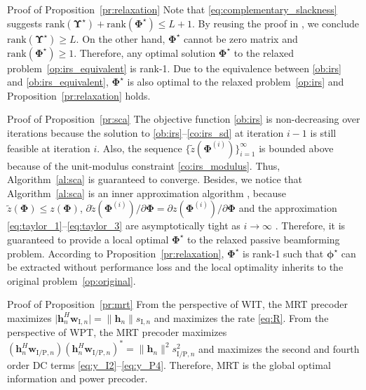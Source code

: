 \documentclass[journal,12pt,onecolumn,draftclsnofoot]{IEEEtran}
\begin{document}
\begin{appendix}
\begin{subsection}{Proof of Proposition~\ref{pr:relaxation}}
			Note that \eqref{eq:complementary_slackness} suggests $\mathrm{rank}(\boldsymbol{\Upsilon}^\star)+\mathrm{rank}(\boldsymbol{\Phi}^\star) \le L+1$. By reusing the proof in \cite[Appendix~A]{Xu2020}, we conclude $\mathrm{rank}(\boldsymbol{\Upsilon}^\star) \ge L$. On the other hand, $\boldsymbol{\Phi}^\star$ cannot be zero matrix and $\mathrm{rank}(\boldsymbol{\Phi}^\star) \ge 1$. Therefore, any optimal solution $\boldsymbol{\Phi}^\star$ to the relaxed problem~\eqref{op:irs_equivalent} is rank-\num{1}. Due to the equivalence between \eqref{ob:irs} and \eqref{ob:irs_equivalent}, $\boldsymbol{\Phi}^\star$ is also optimal to the relaxed problem~\eqref{op:irs} and Proposition~\ref{pr:relaxation} holds.
		\end{subsection}

		\begin{subsection}{Proof of Proposition~\ref{pr:sca}}\label{ap:sca}
			The objective function \eqref{ob:irs} is non-decreasing over iterations because the solution to \eqref{ob:irs}--\eqref{co:irs_sd} at iteration $i-1$ is still feasible at iteration $i$. Also, the sequence $\{\tilde{z}(\boldsymbol{\Phi}^{(i)})\}_{i=1}^{\infty}$ is bounded above because of the unit-modulus constraint \eqref{co:irs_modulus}. Thus, Algorithm~\ref{al:sca} is guaranteed to converge. Besides, we notice that Algorithm~\ref{al:sca} is an inner approximation algorithm \cite{Marks1978}, because $\tilde{z}(\boldsymbol{\Phi}) \le z(\boldsymbol{\Phi})$, $\partial\tilde{z}(\boldsymbol{\Phi}^{(i)})/\partial\boldsymbol{\Phi}=\partial z(\boldsymbol{\Phi}^{(i)})/\partial\boldsymbol{\Phi}$ and the approximation \eqref{eq:taylor_1}--\eqref{eq:taylor_3} are asymptotically tight as $i \to \infty$ \cite{Li2013}. Therefore, it is guaranteed to provide a local optimal $\boldsymbol{\Phi}^{\star}$ to the relaxed passive beamforming problem. According to Proposition~\ref{pr:relaxation}, $\boldsymbol{\Phi}^{\star}$ is rank-\num{1} such that $\boldsymbol{\phi}^{\star}$ can be extracted without performance loss and the local optimality inherits to the original problem~\eqref{op:original}.
		\end{subsection}

		\begin{subsection}{Proof of Proposition~\ref{pr:mrt}}\label{ap:mrt}
			From the perspective of WIT, the MRT precoder maximizes $\lvert{\boldsymbol{h}_{n}^H \boldsymbol{w}_{\mathrm{I}, n}}\rvert = \lVert{\boldsymbol{h}_{n}}\rVert s_{\mathrm{I}, n}$ and maximizes the rate \eqref{eq:R}. From the perspective of WPT, the MRT precoder maximizes $(\boldsymbol{h}_{n}^H \boldsymbol{w}_{\mathrm{I/P}, n})(\boldsymbol{h}_{n}^H \boldsymbol{w}_{\mathrm{I/P}, n})^* = \lVert{\boldsymbol{h}_{n}}\rVert^2 s_{\mathrm{I/P}, n}^2$ and maximizes the second and fourth order DC terms \eqref{eq:y_I2}--\eqref{eq:y_P4}. Therefore, MRT is the global optimal information and power precoder.
		\end{subsection}
	\end{appendix}

	
	
\end{document}
